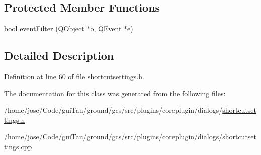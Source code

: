\subsection*{Protected Member Functions}
\begin{DoxyCompactItemize}
\item 
bool \hyperlink{group___core_plugin_gadb41d92ceddef6fe4e1f259b5f640ca5}{event\-Filter} (Q\-Object $\ast$o, Q\-Event $\ast$\hyperlink{_o_p_plots_8m_a9425be9aab51621e317ba7ade564b570}{e})
\end{DoxyCompactItemize}


\subsection{Detailed Description}


Definition at line 60 of file shortcutsettings.\-h.



The documentation for this class was generated from the following files\-:\begin{DoxyCompactItemize}
\item 
/home/jose/\-Code/gui\-Tau/ground/gcs/src/plugins/coreplugin/dialogs/\hyperlink{shortcutsettings_8h}{shortcutsettings.\-h}\item 
/home/jose/\-Code/gui\-Tau/ground/gcs/src/plugins/coreplugin/dialogs/\hyperlink{shortcutsettings_8cpp}{shortcutsettings.\-cpp}\end{DoxyCompactItemize}
